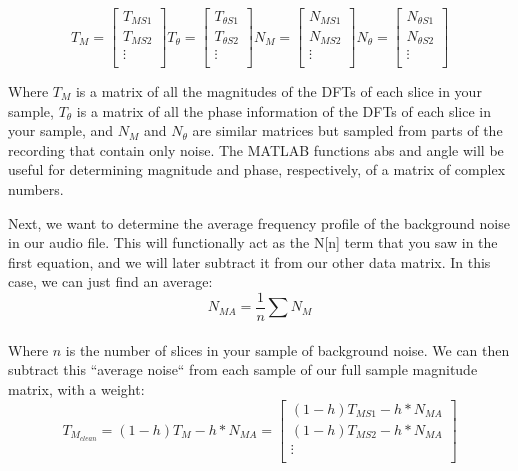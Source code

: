 \documentclass{tufte-handout}
\begin{document}
\begin{equation}\label{eq:sampled_audio}
    T_M=
\begin{bmatrix}
    T_{MS1}       \\
    T_{MS2}       \\
    \vdots \\
\end{bmatrix}
	T_\theta=
\begin{bmatrix}
    T_{\theta S1}       \\
    T_{\theta S2}       \\
    \vdots \\
\end{bmatrix}
	N_M=
\begin{bmatrix}
    N_{MS1}       \\
    N_{MS2}       \\
    \vdots \\
\end{bmatrix}
	N_\theta=
\begin{bmatrix}
    N_{\theta S1}       \\
    N_{\theta S2}       \\
    \vdots \\
\end{bmatrix}
\end{equation}

Where $T_M$ is a matrix of all the magnitudes of the DFTs of each slice in your sample, $T_\theta$ is a matrix of all the phase information of the DFTs of each slice in your sample, and $N_M$ and $N_\theta$ are similar matrices but sampled from parts of the recording that contain only noise. The MATLAB functions abs and angle will be useful for determining magnitude and phase, respectively, of a matrix of complex numbers.

Next, we want to determine the average frequency profile of the background noise in our audio file. This will functionally act as the N[n] term that you saw in the first equation, and we will later subtract it from our other data matrix. In this case, we can just find an average:
\begin{equation}
	N_{MA} = \frac{1}{n}\sum_{}^{} N_M
\end{equation}

Where $n$ is the number of slices in your sample of background noise. We can then subtract this ``average noise`` from each sample of our full sample magnitude matrix, with a weight:
\begin{equation}
	T_{M_{clean}} = (1-h)T_M - h*N_{MA} = 
	\begin{bmatrix}
    (1-h)T_{MS1} - h*N_{MA}       \\
    (1-h)T_{MS2} - h*N_{MA}       \\
    \vdots \\
\end{bmatrix}
\end{equation}
\end{document}
